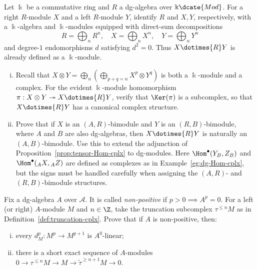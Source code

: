 \begin{Exercises}
	\item Let $\Bbbk$ be a commutative ring and $R$ a dg-algebra over
	$\Bbbk\dcate{Mod}$. For a right $R$-module $X$ and a left $R$-module $Y$,
	identify $R$ and $X,Y$, respectively, with a $\Bbbk$-algebra and
	$\Bbbk$-modules equipped with direct-sum decompositions
	\[ R = \bigoplus_n R^n, \quad X = \bigoplus_n X^n, \quad Y = \bigoplus_n Y^n \]
	and degree-$1$ endomorphisms $d$ satisfying $d^2=0$. Thus
	$X\dotimes{R}Y$ is already defined as a $\Bbbk$-module.
	\begin{enumerate}[(i)]
		\item Recall that
		$X\otimes Y=\bigoplus_n(\bigoplus_{p+q=n}X^p\otimes Y^q)$ is both a
		$\Bbbk$-module and a complex. For the evident $\Bbbk$-module
		homomorphism $\pi:X\otimes Y\twoheadrightarrow X\dotimes{R}Y$, verify
		that $\Ker(\pi)$ is a subcomplex, so that $X\dotimes{R}Y$ has a
		canonical complex structure.

		\item Prove that if $X$ is an $(A,R)$-bimodule and $Y$ is an
		$(R,B)$-bimodule, where $A$ and $B$ are also dg-algebras, then
		$X\dotimes{R}Y$ is naturally an $(A,B)$-bimodule. Use this to extend
		the adjunction of Proposition~\ref{prop:tensor-Hom-cplx} to dg-modules.
		Here $\Hom^\bullet(Y_B,Z_B)$ and $\Hom^\bullet({}_AX,{}_AZ)$ are
		defined as complexes as in Example~\ref{eg:dg-Hom-cplx}, but the signs
		must be handled carefully when assigning the $(A,R)$- and
		$(R,B)$-bimodule structures.
	\end{enumerate}

	\item Fix a dg-algebra $A$ over $\mathcal{A}$. It is called
	\emph{non-positive} if $p>0\implies A^p=0$. For a left (or right)
	$A$-module $M$ and $n\in\Z$, take the truncation subcomplex
	$\tau^{\leq n}M$ as in Definition~\ref{def:truncation-cplx}. Prove that if
	$A$ is non-positive, then:
	\begin{enumerate}[(i)]
		\item every $d_M^p:M^p\to M^{p+1}$ is $A^0$-linear;
		\item there is a short exact sequence of $A$-modules
		$0\to\tau^{\leq n}M\to M\to\tilde\tau^{\geq n+1}M\to0$.
	\end{enumerate}


\end{Exercises}
